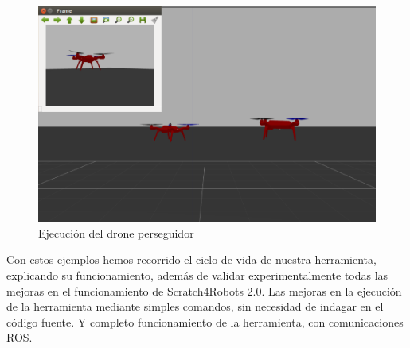 \begin{figure}[H]
    \centering
    \includegraphics[scale=0.60]{img/drones-fly.PNG}
  	\caption{Ejecución del drone perseguidor}
  	\label{fig:drone-pers}
\end{figure}


Con estos ejemplos hemos recorrido el ciclo de vida de nuestra herramienta, explicando su funcionamiento, además de validar experimentalmente todas las mejoras en el funcionamiento de Scratch4Robots 2.0. Las mejoras en la ejecución de la herramienta mediante simples comandos, sin necesidad de indagar en el código fuente. Y completo funcionamiento de la herramienta, con comunicaciones ROS. 

